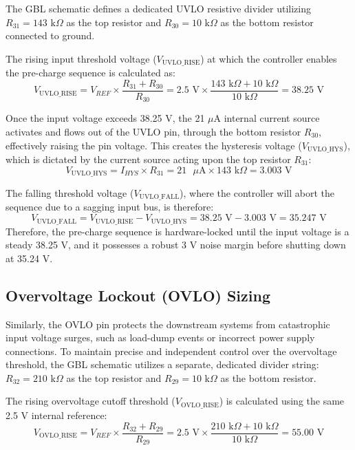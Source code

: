 \documentclass[11pt,a4paper]{article}
\begin{document}
The GBL schematic defines a dedicated UVLO resistive divider utilizing $R_{31} = 143 \text{ k}\Omega$ as the top resistor and $R_{30} = 10 \text{ k}\Omega$ as the bottom resistor connected to ground.

The rising input threshold voltage ($V_{\text{UVLO\_RISE}}$) at which the controller enables the pre-charge sequence is calculated as:
\begin{equation}
V_{\text{UVLO\_RISE}} = V_{REF} \times \frac{R_{31} + R_{30}}{R_{30}} = 2.5 \text{ V} \times \frac{143 \text{ k}\Omega + 10 \text{ k}\Omega}{10 \text{ k}\Omega} = 38.25 \text{ V}
\end{equation}

Once the input voltage exceeds 38.25 V, the 21 $\mu$A internal current source activates and flows out of the UVLO pin, through the bottom resistor $R_{30}$, effectively raising the pin voltage. This creates the hysteresis voltage ($V_{\text{UVLO\_HYS}}$), which is dictated by the current source acting upon the top resistor $R_{31}$:
\begin{equation}
V_{\text{UVLO\_HYS}} = I_{HYS} \times R_{31} = 21 \text{ }\mu\text{A} \times 143 \text{ k}\Omega = 3.003 \text{ V}
\end{equation}

The falling threshold voltage ($V_{\text{UVLO\_FALL}}$), where the controller will abort the sequence due to a sagging input bus, is therefore:
\begin{equation}
V_{\text{UVLO\_FALL}} = V_{\text{UVLO\_RISE}} - V_{\text{UVLO\_HYS}} = 38.25 \text{ V} - 3.003 \text{ V} = 35.247 \text{ V}
\end{equation}
Therefore, the pre-charge sequence is hardware-locked until the input voltage is a steady 38.25 V, and it possesses a robust 3 V noise margin before shutting down at 35.24 V.

\subsection{Overvoltage Lockout (OVLO) Sizing}
Similarly, the OVLO pin protects the downstream systems from catastrophic input voltage surges, such as load-dump events or incorrect power supply connections. To maintain precise and independent control over the overvoltage threshold, the GBL schematic utilizes a separate, dedicated divider string: $R_{32} = 210 \text{ k}\Omega$ as the top resistor and $R_{29} = 10 \text{ k}\Omega$ as the bottom resistor.

The rising overvoltage cutoff threshold ($V_{\text{OVLO\_RISE}}$) is calculated using the same 2.5 V internal reference:
\begin{equation}
V_{\text{OVLO\_RISE}} = V_{REF} \times \frac{R_{32} + R_{29}}{R_{29}} = 2.5 \text{ V} \times \frac{210 \text{ k}\Omega + 10 \text{ k}\Omega}{10 \text{ k}\Omega} = 55.00 \text{ V}
\end{equation}
\end{document}
